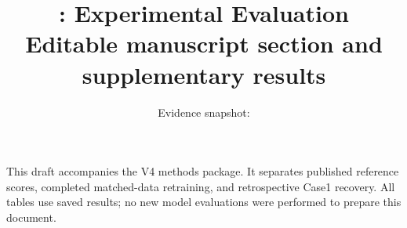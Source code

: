 \documentclass[11pt,a4paper]{article}
\title{\methodname: Experimental Evaluation\\\large Editable manuscript section and supplementary results}
\author{}
\date{Evidence snapshot: \experimentSnapshot}
\begin{document}
\maketitle
\noindent This draft accompanies the V4 methods package. It separates
published reference scores, completed matched-data retraining, and retrospective
Case1 recovery. All tables use saved results; no new model evaluations were
performed to prepare this document.
\tableofcontents
\clearpage
\setcounter{section}{4}

\clearpage
\appendix

\clearpage

\begingroup\raggedright\endgroup
\end{document}
